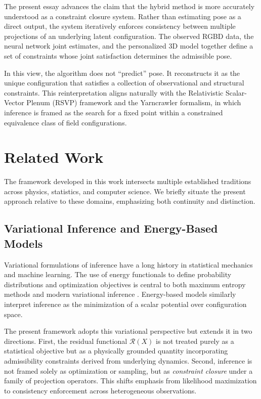 \documentclass[12pt]{article}
\begin{document}
The present essay advances the claim that the hybrid method is more accurately understood as a constraint closure system. Rather than estimating pose as a direct output, the system iteratively enforces consistency between multiple projections of an underlying latent configuration. The observed RGBD data, the neural network joint estimates, and the personalized 3D model together define a set of constraints whose joint satisfaction determines the admissible pose.

In this view, the algorithm does not ``predict'' pose. It reconstructs it as the unique configuration that satisfies a collection of observational and structural constraints. This reinterpretation aligns naturally with the Relativistic Scalar-Vector Plenum (RSVP) framework and the Yarncrawler formalism, in which inference is framed as the search for a fixed point within a constrained equivalence class of field configurations.

\section{Related Work}

The framework developed in this work intersects multiple established traditions across physics, statistics, and computer science. We briefly situate the present approach relative to these domains, emphasizing both continuity and distinction.

\subsection{Variational Inference and Energy-Based Models}

Variational formulations of inference have a long history in statistical mechanics and machine learning. The use of energy functionals to define probability distributions and optimization objectives is central to both maximum entropy methods \cite{jaynes1957} and modern variational inference \cite{wainwright2008, blei2017}. Energy-based models similarly interpret inference as the minimization of a scalar potential over configuration space.

The present framework adopts this variational perspective but extends it in two directions. First, the residual functional $\mathcal{R}(X)$ is not treated purely as a statistical objective but as a physically grounded quantity incorporating admissibility constraints derived from underlying dynamics. Second, inference is not framed solely as optimization or sampling, but as \emph{constraint closure} under a family of projection operators. This shifts emphasis from likelihood maximization to consistency enforcement across heterogeneous observations.
\end{document}
